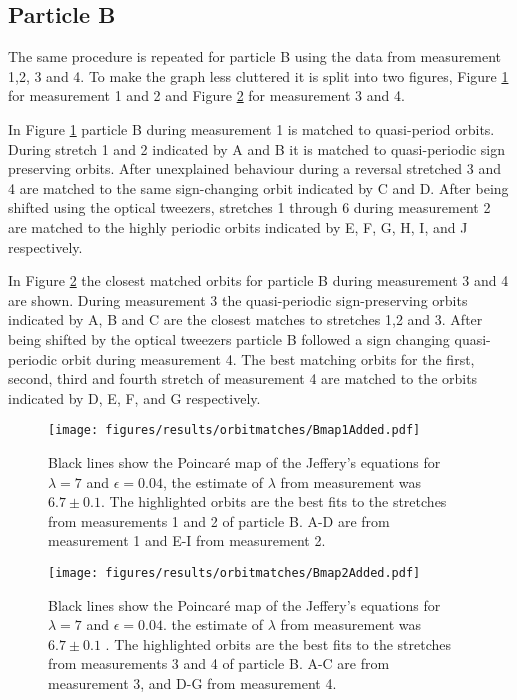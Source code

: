 \subsection{Particle B}

The same procedure is repeated for particle B using the data from measurement 1,2, 3 and 4. To make the graph less cluttered it is split into two figures, Figure \ref{fig:October1Particle4runs2and2Orbits} for measurement 1 and 2 and Figure \ref{fig:October1Particle4_runs3and5Orbits} for measurement 3 and 4.

In Figure \ref{fig:October1Particle4runs2and2Orbits} particle B during measurement 1 is matched to quasi-period orbits. During stretch 1 and 2 indicated by A and B it is matched to quasi-periodic sign preserving orbits. After unexplained behaviour during a reversal stretched 3 and 4 are matched to the same sign-changing orbit indicated by C and D. After being shifted using the optical tweezers, stretches 1 through 6 during measurement 2 are matched to the highly periodic orbits indicated by E, F, G, H, I, and J respectively. 


In Figure \ref{fig:October1Particle4_runs3and5Orbits} the closest matched orbits for particle B during measurement 3 and 4 are shown. During measurement 3 the quasi-periodic sign-preserving orbits indicated by A, B and C are the closest matches to stretches 1,2 and 3.  After being shifted by the optical tweezers particle B followed a sign changing quasi-periodic orbit during measurement 4. The best matching orbits for the first, second, third and fourth stretch of measurement 4 are matched to the orbits indicated by D, E, F, and G respectively. 


\begin{figure}[H]
\centering
\texttt{[image: figures/results/orbitmatches/Bmap1Added.pdf]}
\caption{Black lines show the Poincaré map of the Jeffery's equations for $\lambda = 7$ and $\epsilon=0.04$, the estimate of $\lambda$ from measurement was $6.7 \pm 0.1$. The highlighted orbits are the best fits to the stretches from measurements 1 and 2 of particle B. A-D are from measurement 1 and E-I from measurement 2.}
\label{fig:October1Particle4runs2and2Orbits}
\end{figure}


\begin{figure}[H]
\centering
\texttt{[image: figures/results/orbitmatches/Bmap2Added.pdf]}
\caption{Black lines show the Poincaré map of the Jeffery's equations for $\lambda = 7$ and $\epsilon = 0.04$. the estimate of $\lambda$ from measurement was $6.7 \pm 0.1$ . The highlighted orbits are the best fits to the stretches from measurements 3 and 4 of particle B. A-C are from measurement 3, and D-G from measurement 4.}
\label{fig:October1Particle4_runs3and5Orbits}
\end{figure}


